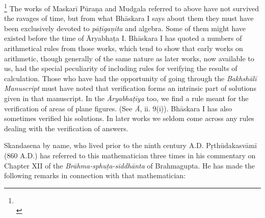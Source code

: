 \documentclass[10pt, openany]{book}
\begin{document}
\newpage

\englishfont{}\renewcommand{\thefootnote}{1}\footnote{\hspace{-2mm} \\} The works of Maskarī Pūraṇa and Mudgala referred
{to above have not survived the ravages of time, but from what}
{Bhāskara I says about them they must have been exclusively}
{devoted to \textit{pāṭīgaṇita} and algebra. Some of them might have}
{existed before the time of Āryabhaṭa I. Bhāskara I has}
{quoted a numbers of arithmetical rules from those works,}
{which tend to show that early works on arithmetic, though}
{generally of the same nature as later works, now available to}
{us, had the special peculiarity of including rules for verifying}
{the results of calculation. Those who have had the opportunity}
{of going through the \textit{Bakhshālī Manuscript} must have}
{noted that verification forms an intrinsic part of solutions given}
{in that manuscript. In the \textit{Āryabhaṭīya} too, we find a rule}
{meant for the verification of areas of plane figures. (See \textit{Ā}, ii. 9(i)). Bhāskara I has also sometimes verified his solutions.}
{In later works we seldom come across any rules dealing with}
{the verification of answers.}

\vspace{0.3cm}{There is another important Hindu mathematician,}
{Skandasena by name, who lived prior to the ninth century}
{A.D. Pṛthūdakasvāmī (860 A.D.) has referred to this}
{mathematician three times in his commentary on Chapter XII}
{of the\textit{ Brāhma-sphuṭa-siddhānta} of Brahmagupta. He has made}
{the following remarks in connection with that mathematician:}
\end{document}
